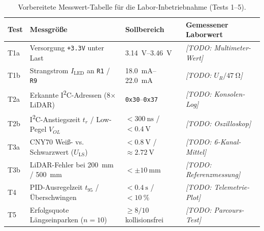 \begin{table}[htbp]
\centering
\caption{Vorbereitete Messwert-Tabelle für die Labor-Inbetriebnahme (Tests 1--5).}
\label{tab:messwerte_labor}
\begin{tabular}{@{}p{1.2cm}p{4.8cm}p{3.2cm}p{4.6cm}@{}}
\toprule
\textbf{Test} & \textbf{Messgröße} & \textbf{Sollbereich} & \textbf{Gemessener Laborwert} \\
\midrule
T1a & Versorgung \texttt{+3.3V} unter Last & \qtyrange{3,14}{3,46}{\volt} & \emph{[TODO: Multimeter-Wert]} \\
T1b & Strangstrom $I_{\mathrm{LED}}$ an \texttt{R1} / \texttt{R9} & \qtyrange{18,0}{22,0}{\milli\ampere} & \emph{[TODO: $U_R / \qty{47}{\ohm}$]} \\
T2a & Erkannte I\textsuperscript{2}C-Adressen (8$\times$ LiDAR) & \texttt{0x30}--\texttt{0x37} & \emph{[TODO: Konsolen-Log]} \\
T2b & I\textsuperscript{2}C-Anstiegszeit $t_r$ / Low-Pegel $V_{OL}$ & $< \qty{300}{\nano\second}$ / $< \qty{0,4}{\volt}$ & \emph{[TODO: Oszilloskop]} \\
T3a & CNY70 Weiß- vs. Schwarzwert ($U_{\mathrm{LS}}$) & $< \qty{0,8}{\volt}$ / $\approx \qty{2,72}{\volt}$ & \emph{[TODO: 6-Kanal-Mittel]} \\
T3b & LiDAR-Fehler bei \qty{200}{\milli\meter} / \qty{500}{\milli\meter} & $< \pm \qty{10}{\milli\meter}$ & \emph{[TODO: Referenzmessung]} \\
T4 & PID-Ausregelzeit $t_{95}$ / Überschwingen & $< \qty{0,4}{\second}$ / $< \qty{10}{\percent}$ & \emph{[TODO: Telemetrie-Plot]} \\
T5 & Erfolgsquote Längseinparken ($n = 10$) & $\ge 8/10$ kollisionsfrei & \emph{[TODO: Parcours-Test]} \\
\bottomrule
\end{tabular}
\end{table}


